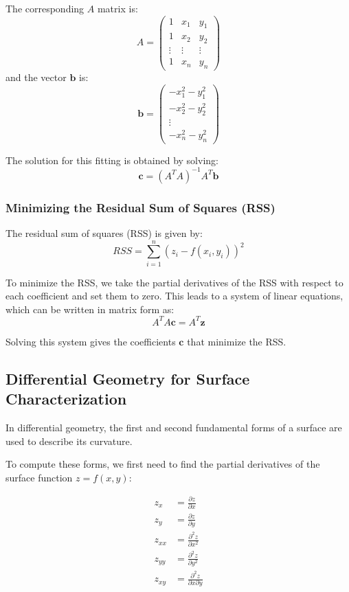 \documentclass[12pt]{article}
\begin{document}
The corresponding \(A\) matrix is:
\[
A = \begin{pmatrix}
1 & x_1 & y_1 \\
1 & x_2 & y_2 \\
\vdots & \vdots & \vdots \\
1 & x_n & y_n
\end{pmatrix}
\]
and the vector \(\mathbf{b}\) is:
\[
\mathbf{b} = \begin{pmatrix}
-x_1^2 - y_1^2 \\
-x_2^2 - y_2^2 \\
\vdots \\
-x_n^2 - y_n^2
\end{pmatrix}
\]

The solution for this fitting is obtained by solving:
\[
\mathbf{c} = (A^T A)^{-1} A^T \mathbf{b}
\]

\subsubsection{Minimizing the Residual Sum of Squares (RSS)}
The residual sum of squares (RSS) is given by:
\[
RSS = \sum_{i=1}^{n} (z_i - f(x_i, y_i))^2
\]

To minimize the RSS, we take the partial derivatives of the RSS with respect to each coefficient and set them to zero. This leads to a system of linear equations, which can be written in matrix form as:
\[
A^T A \mathbf{c} = A^T \mathbf{z}
\]

Solving this system gives the coefficients \(\mathbf{c}\) that minimize the RSS.

\subsection{Differential Geometry for Surface Characterization}
In differential geometry, the first and second fundamental forms of a surface are used to describe its curvature.

To compute these forms, we first need to find the partial derivatives of the surface function \(z = f(x, y)\):

\[
\begin{aligned}
z_x &= \frac{\partial z}{\partial x} \\
z_y &= \frac{\partial z}{\partial y} \\
z_{xx} &= \frac{\partial^2 z}{\partial x^2} \\
z_{yy} &= \frac{\partial^2 z}{\partial y^2} \\
z_{xy} &= \frac{\partial^2 z}{\partial x \partial y}
\end{aligned}
\]
\end{document}
